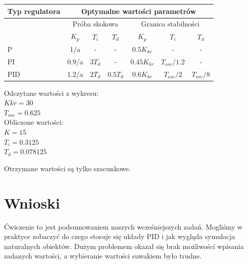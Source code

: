 \documentclass[a4paper,10pt]{article}
\begin{document}
\begin{enumerate}
\begin{tabular}{ | l | c | c | c | c | c | c | }
\hline
  Typ regulatora & \multicolumn{6}{|c|}{Optymalne wartości parametrów} \\   \hline
   & \multicolumn{3}{|c|}{Próba skokowa} & \multicolumn{3}{|c|}{Granica stabilności} \\   \hline
   & $K_{p}$ & $T_{i}$ & $T_{d}$ & $K_{p}$ & $T_{i}$ & $T_{d}$\\   \hline
   P & 1/a & - & - & $0.5K_{kr}$ & - & - \\   \hline
   PI & 0.9/a & $3 T_{d}$ & - & $0.45K_{kr}$ & $T_{osc}/1.2$ & - \\   \hline
   PID & 1.2/a & $2T_{d}$ & $0.5T_d$ & $0.6K_{kr}$ & $T_{osc}/2$ & $T_{osc}/8$ \\   \hline
\hline
\end{tabular}
\newline

Odczytane wartości z wykresu:\\
$Kkr=30$\\
$T_{osc}=0.625$\\
Obliczone wartości:\\
$K=15$\\
$T_{i}=0.3125$\\
$T_{d}=0.078125$\\
\end{enumerate}
Otrzymane wartości są tylko szacunkowe.

\section{Wnioski}
Ćwiczenie to jest podsumowaniem naszych wcześniejszych zadań. Mogliśmy w praktyce zobaczyć do czego stosuje się układy PID i jak wygląda symulacja naturalnych obiektów. Dużym problemem okazał się brak możliwości wpisania zadanych wartości, a wybieranie wartości suwakiem było trudne.
\end{document}

